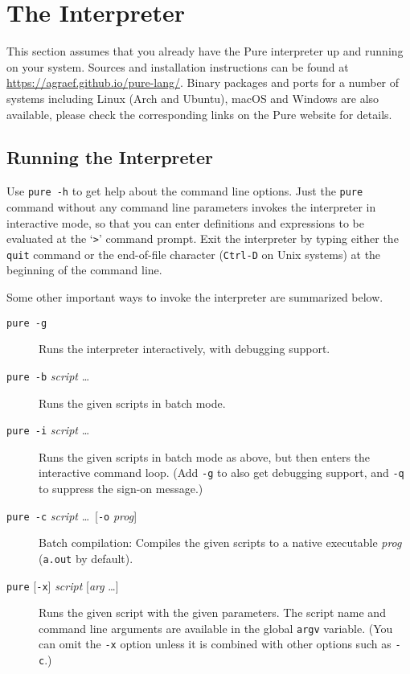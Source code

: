 \documentclass[a4paper,12pt]{article}
\newcommand{\nt}[1]{\textrm{\textit{#1\/}}}
\begin{document}
\section{The Interpreter}
\label{Interpreter}

This section assumes that you already have the Pure interpreter up and running on your system. Sources and installation instructions can be found at \url{https://agraef.github.io/pure-lang/}. Binary packages and ports for a number of systems including Linux (Arch and Ubuntu), macOS and Windows are also available, please check the corresponding links on the Pure website for details.

\subsection{Running the Interpreter}

Use \verb|pure -h| to get help about the command line options. Just the \verb|pure| command without any command line parameters invokes the interpreter in interactive mode, so that you can enter definitions and expressions to be evaluated at the `\verb|>|' command prompt. Exit the interpreter by typing either the \verb|quit| command or the end-of-file character (\verb|Ctrl-D| on Unix systems) at the beginning of the command line.

Some other important ways to invoke the interpreter are summarized below.

\begin{description}
\item[\rm\texttt{pure -g}] Runs the interpreter interactively, with debugging support.
\item[\rm\texttt{pure -b} \nt{script} \ldots] Runs the given scripts in batch mode.
\item[\rm\texttt{pure -i} \nt{script} \ldots] Runs the given scripts in batch mode as above, but then enters the interactive command loop. (Add \texttt{-g} to also get debugging support, and \texttt{-q} to suppress the sign-on message.)
\item[\rm\texttt{pure -c} \nt{script} \ldots\ {[\texttt{-o} \nt{prog}]}] Batch compilation: Compiles the given scripts to a native executable \nt{prog} (\texttt{a.out} by default).
\item[\rm\texttt{pure} {[\texttt{-x}]} \nt{script} {[\nt{arg} \ldots]}] Runs the given script with the given parameters. The script name and command line arguments are available in the global \verb|argv| variable. (You can omit the \verb|-x| option unless it is combined with other options such as \verb|-c|.)
\end{description}
\end{document}
